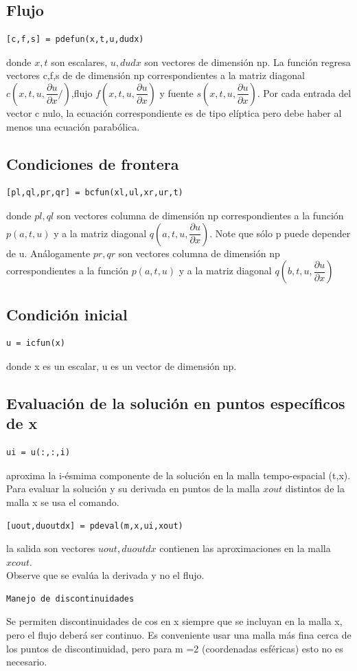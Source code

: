 \documentclass[10pt,a4paper]{article}
\begin{document}
\subsection{Flujo} 
\begin{verbatim}
[c,f,s] = pdefun(x,t,u,dudx)
\end{verbatim}
donde $x, t$ son escalares, $u, dudx$ son vectores de dimensión np. La función regresa
vectores c,f,s de de dimensión np correspondientes a la matriz diagonal $c(x,t,u,\dfrac{\partial u}{\partial x} / )$,flujo $f(x,t,u ,\dfrac{\partial u}{\partial x} )$ y fuente $s(x,t,u , \dfrac{\partial u}{\partial x} )$. Por cada entrada del vector c nulo, la ecuación correspondiente es de tipo elíptica pero debe haber al menos una ecuación parabólica.

\subsection{Condiciones de frontera} 
\begin{verbatim}
[pl,ql,pr,qr] = bcfun(xl,ul,xr,ur,t)
\end{verbatim}
donde $pl, ql$ son vectores columna de dimensión np correspondientes a la función $p(a,t,u)$ y a la matriz diagonal $q(a,t,u,\dfrac{\partial u}{\partial x})$. Note que sólo p puede depender de u. Análogamente $pr, qr$ son vectores columna de dimensión
np correspondientes a la función $p(a,t,u)$ y a la matriz diagonal $q(b,t,u ,\dfrac{\partial u}{\partial x})$
\subsection{Condición inicial}
\begin{verbatim}
u = icfun(x)
\end{verbatim}
donde x es un escalar, u es un vector de dimensión np. 
\subsection{Evaluación de la solución en puntos específicos de x} 
\begin{verbatim}
ui = u(:,:,i)
\end{verbatim}
aproxima la i-ésmima componente de la solución en la malla tempo-espacial (t,x).\\
Para evaluar la solución y su derivada en puntos de la malla  $xout$ distintos de la malla x se usa el comando.
\begin{verbatim}
[uout,duoutdx] = pdeval(m,x,ui,xout)
\end{verbatim}
la salida son vectores $uout,duoutdx$ contienen las aproximaciones en la malla $xcout$.\\
Observe que se evalúa la derivada y no el flujo. 
\begin{verbatim}
Manejo de discontinuidades
\end{verbatim} 
Se permiten discontinuidades de cos en x siempre que se incluyan en la malla x, pero el
flujo deberá ser continuo. Es conveniente usar una malla más fina cerca de los puntos de
discontinuidad, pero para m =2 (coordenadas esféricas) esto no es necesario. \\
\end{document}
